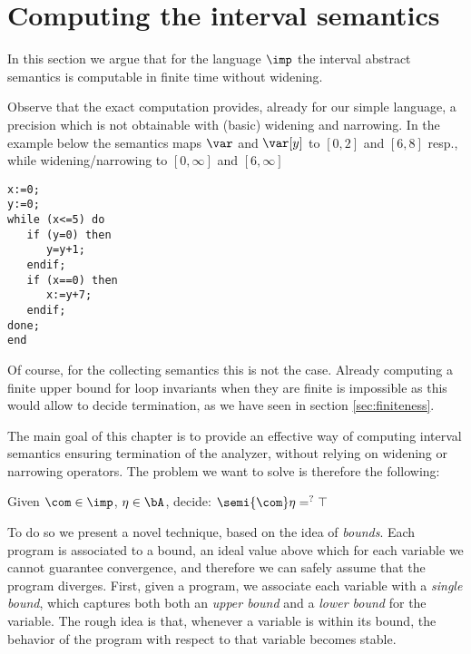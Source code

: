 \section{Computing the interval semantics} 
\label{sec:computingint}

In this section we argue that for the language \(\imp\) the interval
abstract semantics is computable in finite time without widening.

Observe that the exact computation provides, already for our simple
language, a precision which is not obtainable with (basic) widening
and narrowing. In the example below the semantics maps \(\var\) and
\(\var[y]\) to \([0,2]\) and \([6,8]\) resp., while widening/narrowing
to \([0,\infty]\) and \([6,\infty]\)

\begin{verbatim}
x:=0;
y:=0;
while (x<=5) do
   if (y=0) then
      y=y+1;
   endif;
   if (x==0) then
      x:=y+7;
   endif;
done;
end
\end{verbatim}

Of course, for the collecting semantics this is not the case. Already
computing a finite upper bound for loop invariants when they are
finite is impossible as this would allow to decide termination, as we
have seen in section \ref{sec:finiteness}.

The main goal of this chapter is to provide an effective way of
computing interval semantics ensuring termination of the analyzer,
without relying on widening or narrowing operators. The problem we
want to solve is therefore the following:

\begin{problem}\label{problem1}
  Given \(\com\in \imp\), \(\eta \in \bA\), decide: \(\semi{\com} \eta
  =^? \top\)
\end{problem}

To do so we present a novel technique, based on the idea of
\emph{bounds}. Each program is associated to a bound, an ideal value
above which for each variable we cannot guarantee convergence, and
therefore we can safely assume that the program diverges.  First,
given a program, we associate each variable with a \emph{single
  bound}, which captures both both an \emph{upper bound} and a
\emph{lower bound} for the variable. The rough idea is that, whenever
a variable is within its bound, the behavior of the program with
respect to that variable becomes stable. %

